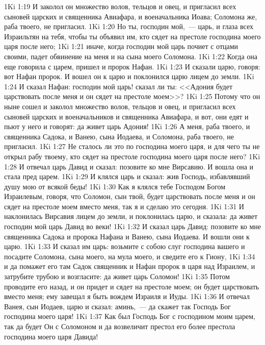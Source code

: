 \vs 1Ki 1:19 И заколол он множество волов, тельцов и овец, и пригласил всех сыновей царских и священника Авиафара, и военачальника Иоава; Соломона же, раба твоего, не пригласил.
\vs 1Ki 1:20 Но ты, господин мой,~--- царь, и глаза всех Израильтян  на тебя, чтобы ты объявил им, кто сядет на престоле господина моего царя после него;
\vs 1Ki 1:21 иначе, когда господин мой царь почиет с отцами своими, падет обвинение на меня и на сына моего Соломона.
\vs 1Ki 1:22 Когда она еще говорила с царем, пришел и пророк Нафан.
\vs 1Ki 1:23 И сказали царю, говоря: вот Нафан пророк. И вошел он к царю и поклонился царю лицем до земли.
\vs 1Ki 1:24 И сказал Нафан: господин мой царь! сказал ли ты: <<Адония будет царствовать после меня и он сядет на престоле моем>>?
\vs 1Ki 1:25 Потому что он ныне сошел и заколол множество волов, тельцов и овец, и пригласил всех сыновей царских и военачальников и священника Авиафара, и вот, они едят и пьют у него и говорят: да живет царь Адония!
\vs 1Ki 1:26 А меня, раба твоего, и священника Садока, и Ванею, сына Иодаева, и Соломона, раба твоего, не пригласил.
\vs 1Ki 1:27 Не сталось ли это по  господина моего царя, и для чего ты не открыл рабу твоему, кто сядет на престоле господина моего царя после него?
\vs 1Ki 1:28 И отвечал царь Давид и сказал: позовите ко мне Вирсавию. И вошла она и стала пред царем.
\vs 1Ki 1:29 И клялся царь и сказал: жив Господь, избавлявший душу мою от всякой беды!
\vs 1Ki 1:30 Как я клялся тебе Господом Богом Израилевым, говоря, что Соломон, сын твой, будет царствовать после меня и он сядет на престоле моем вместо меня, так я и сделаю это сегодня.
\vs 1Ki 1:31 И наклонилась Вирсавия лицем до земли, и поклонилась царю, и сказала: да живет господин мой царь Давид во веки!
\rsbpar\vs 1Ki 1:32 И сказал царь Давид: позовите ко мне священника Садока и пророка Нафана и Ванею, сына Иодаева. И вошли они к царю.
\vs 1Ki 1:33 И сказал им царь: возьмите с собою слуг господина вашего и посадите Соломона, сына моего, на мула моего, и сведите его к Гиону,
\vs 1Ki 1:34 и да помажет его там Садок священник и Нафан пророк в царя над Израилем, и затрубите трубою и возгласите: да живет царь Соломон!
\vs 1Ki 1:35 Потом проводите его назад, и он придет и сядет на престоле моем; он будет царствовать вместо меня; ему завещал я быть вождем Израиля и Иуды.
\vs 1Ki 1:36 И отвечал Ванея, сын Иодаев, царю и сказал: аминь,~--- да скажет так Господь Бог господина моего царя!
\vs 1Ki 1:37 Как был Господь Бог с господином моим царем, так да будет Он с Соломоном и да возвеличит престол его более престола господина моего царя Давида!
